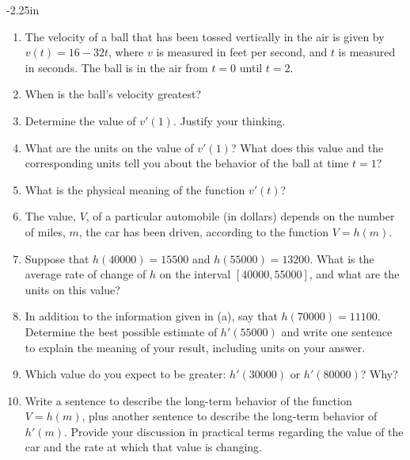 \begin{adjustwidth*}{}{-2.25in}
\setlength{\columnsep}{25pt}
\begin{multicols*}{2}\small

\begin{enumerate}[1),start=20]
\item The velocity of a ball that has been tossed vertically in the air is given by $v(t) = 16 - 32t$, where $v$ is measured in feet per second, and $t$ is measured in seconds.  The ball is in the air from $t = 0$ until $t = 2$.
\ba
\item When is the ball's velocity greatest?
\item Determine the value of $v'(1)$.  Justify your thinking.
\item What are the units on the value of $v'(1)$?  What does this value and the corresponding units tell you about the behavior of the ball at time $t = 1$?  
\item What is the physical meaning of the function $v'(t)$?
\ea

\item The value, $V$, of a particular automobile (in dollars) depends on the number of miles, $m$, the car has been driven, according to the function $V = h(m)$.  
\ba
\item Suppose that $h(40000) = 15500$ and $h(55000) = 13200$.  What is the average rate of change of $h$ on the interval $[40000,55000]$, and what are the units on this value?
\item In addition to the information given in (a), say that $h(70000) = 11100$.  Determine the best possible estimate of $h'(55000)$ and write one sentence to explain the meaning of your result, including units on your answer.
\item Which value do you expect to be greater: $h'(30000)$ or $h'(80000)$?  Why?
\item Write a sentence to describe the long-term behavior of the function $V = h(m)$, plus another sentence to describe the long-term behavior of $h'(m)$.  Provide your discussion in practical terms regarding the value of the car and the rate at which that value is changing.
\ea

\end{enumerate}

\end{multicols*}
\end{adjustwidth*}
\afterexercises